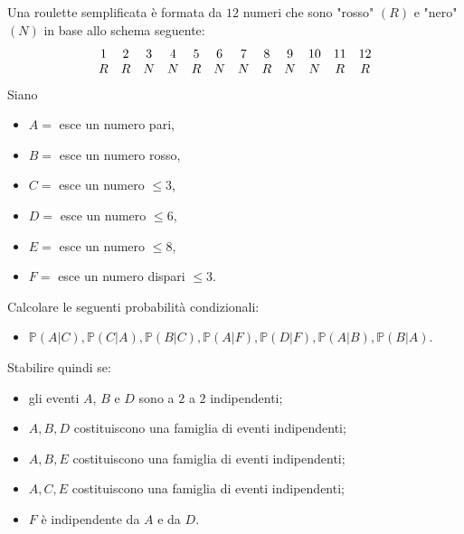 \subsection{}

Una roulette semplificata è formata da $12$ numeri che sono "rosso" $( R)$ e "nero" $( N)$ in base allo schema seguente:
\begin{equation*}
\begin{array}{ c c c c c c c c c c c c }
1 & 2 & 3 & 4 & 5 & 6 & 7 & 8 & 9 & 10 & 11 & 12\\
R & R & N & N & R & N & N & R & N & N & R & R
\end{array}
\end{equation*}
Siano
\begin{itemize}
\item $A=$ esce un numero pari,
\item $B=$ esce un numero rosso,
\item $C=$ esce un numero $\leq 3$,
\item $D=$ esce un numero $\leq 6$,
\item $E=$ esce un numero $\leq 8$,
\item $F=$ esce un numero dispari $\leq 3$.
\end{itemize}

Calcolare le seguenti probabilità condizionali:
\begin{itemize}
\item $\mathbb{P}( A|C) ,\mathbb{P}( C|A) ,\mathbb{P}( B|C) ,\mathbb{P}( A|F) ,\mathbb{P}( D|F) ,\mathbb{P}( A|B) ,\mathbb{P}( B|A)$.
\end{itemize}

Stabilire quindi se:
\begin{itemize}
\item gli eventi $A$, $B$ e $D$ sono a $2$ a $2$ indipendenti;
\item $A,B,D$ costituiscono una famiglia di eventi indipendenti;
\item $A,B,E$ costituiscono una famiglia di eventi indipendenti;
\item $A,C,E$ costituiscono una famiglia di eventi indipendenti;
\item $F$ è indipendente da $A$ e da $D$.
\end{itemize}
\subsection{}

